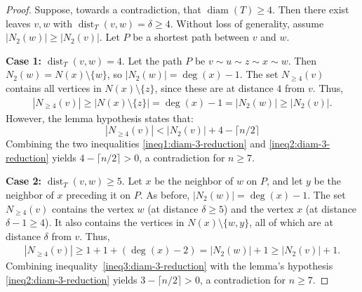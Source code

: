 \documentclass[12pt,reqno]{amsart}
\theoremstyle{definition}
\newcommand{\diam}{\operatorname{diam}}
\newcommand{\dist}{\operatorname{dist}}
\begin{document}
\begin{proof}
    Suppose, towards a contradiction, that $\diam(T)\ge 4$. Then there exist leaves $v, w$ with $\dist_T(v,w)=\delta \ge 4$. Without loss of generality, assume $|N_2(w)| \ge |N_2(v)|$. Let $P$ be a shortest path between $v$ and $w$.

    \textbf{Case 1:} $\dist_T(v,w)=4$. Let the path $P$ be $v \sim u \sim z \sim x \sim w$. Then $N_2(w) = N(x) \setminus \{w\}$, so $|N_2(w)| = \deg(x)-1$. The set $N_{\ge 4}(v)$ contains all vertices in $N(x) \setminus \{z\}$, since these are at distance $4$ from $v$. Thus,
\begin{align}\label{ineq1:diam-3-reduction}
 |N_{\ge 4}(v)| \ge |N(x) \setminus \{z\}| = \deg(x)-1 = |N_2(w)| \ge |N_2(v)|.
\end{align}
However, the lemma hypothesis states that:
\begin{equation}\label{ineq2:diam-3-reduction}
    |N_{\ge 4}(v)| < |N_2(v)| + 4 - \lceil n/2 \rceil
\end{equation}
Combining the two inequalities \eqref{ineq1:diam-3-reduction} and \eqref{ineq2:diam-3-reduction} yields $4-\lceil n/2\rceil > 0$, 
a contradiction for $n\geq 7$.

    \textbf{Case 2:} $\dist_T(v, w)\geq 5$. Let $x$ be the neighbor of $w$ on $P$, and let $y$ be the neighbor of $x$ preceding it on $P$. As before, $|N_2(w)| = \deg(x)-1$. The set $N_{\ge 4}(v)$ contains the vertex $w$ (at distance $\delta \ge 5$) and the vertex $x$ (at distance $\delta-1 \ge 4$). It also contains the vertices in $N(x) \setminus \{w, y\}$, all of which are at distance $\delta$ from $v$. Thus,
\begin{align}\label{ineq3:diam-3-reduction}
    |N_{\ge 4}(v)| \geq 1 + 1 + (\deg(x)-2) = |N_2(w)|+1 \geq |N_2(v)|+1.
\end{align}
Combining inequality~\eqref{ineq3:diam-3-reduction} with the lemma's hypothesis \eqref{ineq2:diam-3-reduction} yields $3-\lceil n/2\rceil>0$, a contradiction for $n\geq 7$.
\end{proof}
\end{document}
